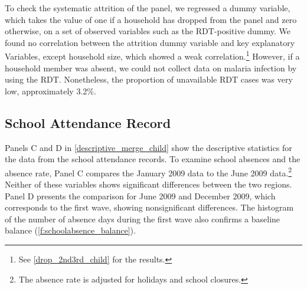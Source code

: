 \documentclass[fleqn,11pt]{article}
\begin{document}
% 

% 

% 

To check the systematic attrition of the panel, we regressed a dummy variable, which takes the value of one if a household has dropped from the panel and zero otherwise, on a set of observed variables such as the RDT-positive dummy. We found no correlation between the attrition dummy variable and key explanatory
Variables, except household size, which showed a weak correlation.\footnote{See \autoref{drop_2nd3rd_child} for the results.} However, if a household member was
absent, we could not collect data on malaria infection by using the RDT. Nonetheless, the proportion of unavailable RDT cases was very low, approximately 3.2\%.

\subsection{School Attendance Record}


Panels C and D in \autoref{descriptive_merge_child} show the descriptive statistics for the data from the school attendance records. To examine  school absences and the absence rate, Panel C compares the January 2009 data to the June 2009 data.\footnote{The absence rate is adjusted for holidays and school closures.} Neither of these variables shows significant differences between the two regions. Panel D presents the comparison for June 2009 and December 2009, which corresponds to the first wave, showing nonsignificant differences. The histogram of the number of absence days during the first wave also confirms a baseline balance (\autoref{f:schoolabsence_balance}).
\end{document}
